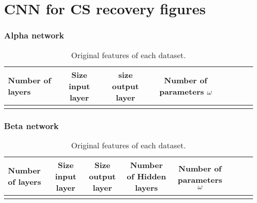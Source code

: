 \appendix
\chapter{CNN for CS recovery figures}

\subsection{Alpha network}
\begin{table}[tb]
\caption[Details of $\alpha$ Network]{Original features of each dataset.}
\label{tab:AlphaNetpar}
\centering
\begin{tabular}{l*{6}{c}r}
Number of layers & Size input layer & size output layer & Number of parameters $\omega$\\
\hline
   &  &  &  &  \\
\bottomrule 
\end{tabular}  
\end{table}

\subsection{Beta network}

\begin{table}[tb]
\caption[Details of $\beta$ Network]{Original features of each dataset.}
\label{tab:BetaNetpar}
\centering
\begin{tabular}{l*{6}{c}r}
Number of layers & Size input layer & Size output layer & Number of Hidden layers & Number of parameters $\omega$\\
\hline
   &  &  &  &  \\
\bottomrule 
\end{tabular}  
\end{table}
